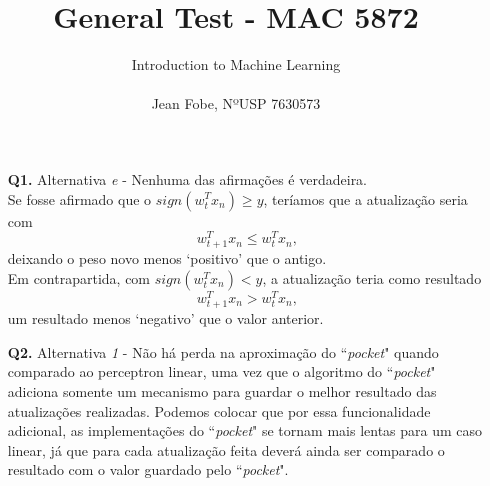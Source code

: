 \documentclass[12pt]{article}
\begin{document}
 
 
\title{General Test - MAC 5872}
\thispagestyle{fancy}
\author{
	Introduction to Machine Learning\\\\
    Jean Fobe, NºUSP 7630573
    }

\maketitle

\begin{enumerate}

\item [\textbf{Q1.}] Alternativa \textit{e} - Nenhuma das afirmações é verdadeira. \\
Se fosse afirmado que o $sign(w^{T}_tx_n) \geq y$, teríamos que a atualização seria com \[w^{T}_{t+1}x_n \leq w^{T}_tx_n,\] deixando o peso novo menos `positivo' que o antigo. \\
Em contrapartida, com $sign(w^{T}_tx_n) < y$, a atualização teria como resultado \[w^{T}_{t+1}x_n > w^{T}_tx_n,\] um resultado menos `negativo' que o valor anterior.
     
\item [\textbf{Q2.}] Alternativa \textit{1} - Não há perda na aproximação do ``\textit{pocket}" quando comparado ao perceptron linear, uma vez que o algoritmo do ``\textit{pocket}" adiciona somente um mecanismo para guardar o melhor resultado das atualizações realizadas. Podemos colocar que por essa funcionalidade adicional, as implementações do ``\textit{pocket}" se tornam mais lentas para um caso linear, já que para cada atualização feita  deverá ainda ser comparado o resultado com o valor guardado pelo ``\textit{pocket}".


\end{enumerate}
\end{document}
